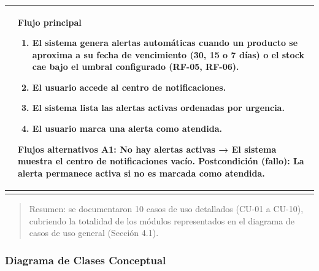 \documentclass[
]{article}
\newcounter{none} %
\begin{document}
{\def\LTcaptype{none} %
\begin{longtable}[]{@{}
  >{\raggedright\arraybackslash}p{}
  >{\raggedright\arraybackslash}p{}@{}}
\toprule\noalign{}
\begin{minipage}[b]{\linewidth}\raggedright
\end{minipage} & \begin{minipage}[b]{\linewidth}\raggedright
\textbf{Flujo principal}

\begin{enumerate}
\def\labelenumi{\arabic{enumi}.}
\item
  El sistema genera alertas automáticas cuando un producto se aproxima a
  su fecha de vencimiento (30, 15 o 7 días) o el stock cae bajo el
  umbral configurado (RF-05, RF-06).
\item
  El usuario accede al centro de notificaciones.
\item
  El sistema lista las alertas activas ordenadas por urgencia.
\item
  El usuario marca una alerta como atendida.
\end{enumerate}

\textbf{Flujos alternativos} A1: No hay alertas activas → El sistema muestra el centro de
notificaciones vacío. \textbf{Postcondición (fallo):} La alerta permanece activa si no es
marcada como atendida.
\end{minipage} \\
\midrule\noalign{}
\endhead
\bottomrule\noalign{}
\endlastfoot
\end{longtable}
}

\begin{quote}
Resumen: se documentaron 10 casos de uso detallados (CU-01 a CU-10),
cubriendo la totalidad de los módulos representados en el diagrama de
casos de uso general (Sección 4.1).
\end{quote}

\subsubsection{Diagrama de Clases
Conceptual}\label{diagrama-de-clases-conceptual}
\end{document}
